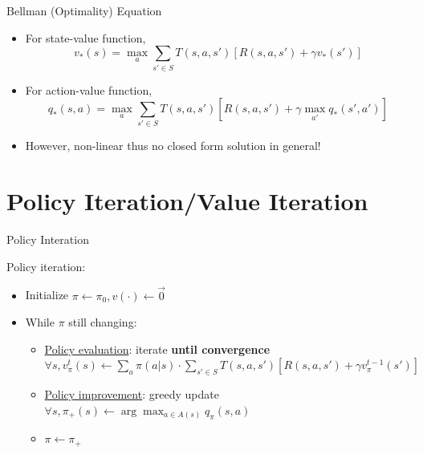 \documentclass{beamer}
\begin{document}
\begin{frame}{Bellman (Optimality) Equation}
    \begin{itemize}
        \item For state-value function,
        \[
        v_*(s) = \max_a \sum_{s'\in S} T(s, a, s')[R(s, a, s') + \gamma v_*(s')]
        \]
        
        \item For action-value function,
        \[
        q_*(s,a) 
        = \max_a \sum_{s'\in S} T(s, a, s')[R(s, a, s') + \gamma \max_{a'} q_*(s', a')]
        \]
        \item \alert{However, non-linear thus no closed form solution in general!}
    \end{itemize}
\end{frame}


\section{Policy Iteration/Value Iteration}



\begin{frame}{Policy Interation}
    \begin{exampleblock}{Policy iteration:}
  	\begin{itemize}
  		\item Initialize $\pi \gets \pi_0, v(\cdot) \gets \vec{0}$
  		\item While $\pi$ still changing:
  		\begin{itemize}
  			\item \underline{Policy evaluation}: iterate \textbf{until convergence}
  			$\forall s,
  			v^t_\pi(s) \gets \sum_a \pi(a|s)\cdot \sum_{s'\in S} T(s, a, s')[R(s, a, s') + \gamma v^{t-1}_\pi(s')]$
  			\item \underline{Policy improvement}: greedy update
			$\forall s,
			\pi_{+}(s) \gets \arg\max_{a\in A(s)} q_{\pi}(s, a)$
  			\item $\pi \gets \pi_{+}$
  		\end{itemize}
  	\end{itemize}
    \end{exampleblock}
\end{frame}
\end{document}
